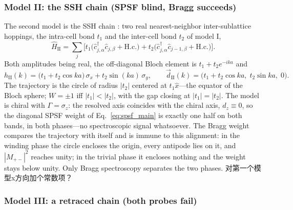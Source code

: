 \documentclass[onecolumn,aps,prl,superscriptaddress,longbibliography]{revtex4-2}
\begin{document}
\subsubsection{Model II: the SSH chain (SPSF blind, Bragg succeeds)}\label{subsubsec:modelII}

The second model is the SSH chain \cite{su1979,asboth2016}: two real nearest-neighbor inter-sublattice hoppings, the intra-cell bond $t_1$ and the inter-cell bond $t_2$ of model I,
\begin{equation}\label{eq:modelII}
\hat{H}_{\mathrm{II}}=\sum_j\Big[
t_1\big(\hat{c}_{j,\alpha}^{\dagger}\hat{c}_{j,\beta}+\mathrm{H.c.}\big)
+t_2\big(\hat{c}_{j,\alpha}^{\dagger}\hat{c}_{j-1,\beta}+\mathrm{H.c.}\big)\Big].
\end{equation}
Both amplitudes being real, the off-diagonal Bloch element is $t_1+t_2e^{-ika}$ and
\begin{equation}\label{eq:modelII_k}
h_{\mathrm{II}}(k)=\big(t_1+t_2\cos ka\big)\,\sigma_x+t_2\sin(ka)\,\sigma_y,
\qquad
\vec{d}_{\mathrm{II}}(k)=\big(t_1+t_2\cos ka,\;t_2\sin ka,\;0\big).
\end{equation}
The trajectory is the circle of radius $|t_2|$ centered at $t_1\hat{x}$---the equator of the Bloch sphere; $W=\pm1$ iff $|t_1|<|t_2|$, with the gap closing at $|t_1|=|t_2|$. The model is chiral with $\Gamma=\sigma_z$: the resolved axis coincides with the chiral axis, $d_z\equiv0$, so the diagonal SPSF weight of Eq.~\eqref{eq:spsf_main} is exactly one half on both bands, in both phases---no spectroscopic signal whatsoever. The Bragg weight compares the trajectory with itself and is immune to this alignment: in the winding phase the circle encloses the origin, every antipode lies on it, and $|M_{+-}|^2$ reaches unity; in the trivial phase it encloses nothing and the weight stays below unity. Only Bragg spectroscopy separates the two phases.
对第一个模型x方向加个常数项？



\subsubsection{Model III: a retraced chain (both probes fail)}\label{subsubsec:modelIII}
\end{document}
